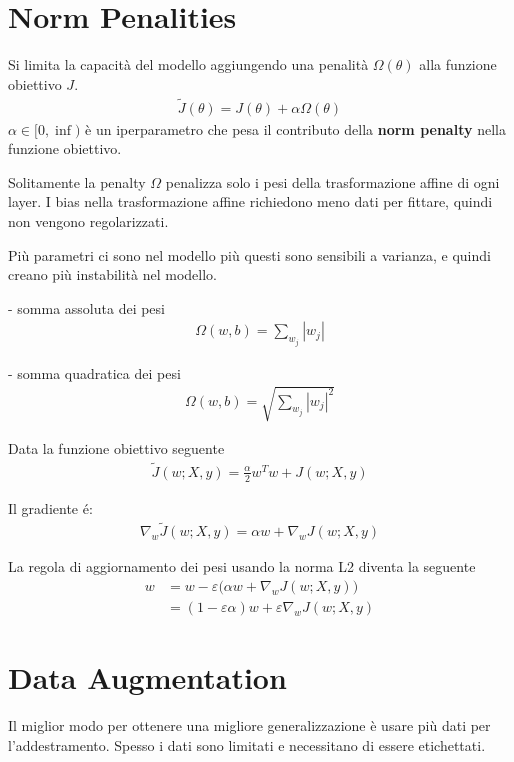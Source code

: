 \section{Norm Penalities}
Si limita la capacità del modello aggiungendo una penalità $\Omega(\theta)$ alla funzione obiettivo $J$.
%
\begin{align*}
  \tilde{J}(\theta) = J(\theta) + \alpha \Omega(\theta)
\end{align*}
%
$\alpha \in [0, \inf)$ è un iperparametro che pesa il contributo della \textbf{norm penalty} nella funzione obiettivo.

Solitamente la penalty $\Omega$ penalizza solo i pesi della trasformazione affine di ogni layer.
I bias nella trasformazione affine richiedono meno dati per fittare, quindi non vengono regolarizzati.

Più parametri ci sono nel modello più questi sono sensibili a varianza, e quindi creano più instabilità nel modello.

- somma assoluta dei pesi
\begin{align*}
  \Omega(w, b) = \sum_{w_j}|w_j|
\end{align*}

- somma quadratica dei pesi
\begin{align*}
  \Omega(w, b) = \sqrt{\sum_{w_j}|w_j|^2}
\end{align*}

Data la funzione obiettivo seguente
\begin{align*}
  \tilde{J}(w; X, y) = \frac{\alpha}{2} w^T w + J(w; X, y)
\end{align*}

Il gradiente é:
\begin{align*}
  \nabla_w \tilde{J}(w; X, y) = \alpha w + \nabla_w J(w; X, y)
\end{align*}

La regola di aggiornamento dei pesi usando la norma L2 diventa la seguente
\begin{align*}
  w & = w - \varepsilon \big( \alpha w + \nabla_w J(w; X, y) \big)   \\
    & = (1 - \varepsilon \alpha) w + \varepsilon \nabla_w J(w; X, y)
\end{align*}

\section{Data Augmentation}
Il miglior modo per ottenere una migliore generalizzazione è usare più dati per l'addestramento.
Spesso i dati sono limitati e necessitano di essere etichettati.

